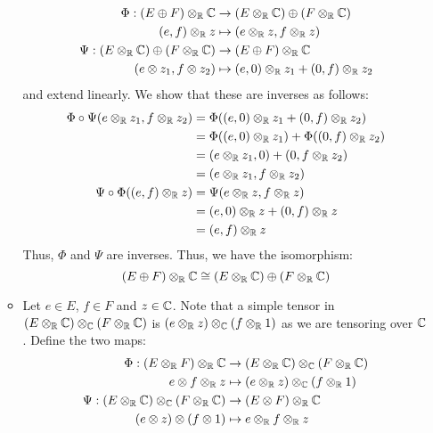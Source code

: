 \documentclass[12pt]{article}
\begin{document}
\begin{solution}
\begin{enumerate}
\begin{itemize}
            \begin{align*}
                \Phi: (E \oplus F) \otimes_\mathbb R \mathbb C &\to (E \otimes_\mathbb R \mathbb C) \oplus (F \otimes_\mathbb R \mathbb C) \\
                (e, f) \otimes_\mathbb R z &\mapsto (e \otimes_\mathbb R z, f \otimes_\mathbb R z) \\
                \Psi: (E \otimes_\mathbb R \mathbb C) \oplus (F \otimes_\mathbb R \mathbb C) &\to (E \oplus F) \otimes_\mathbb R \mathbb C \\
                (e \otimes z_1, f \otimes z_2) &\mapsto (e, 0) \otimes_\mathbb R z_1 + (0, f) \otimes_\mathbb R z_2
            \end{align*} 
            and extend linearly. We show that these are inverses as follows:
            \begin{align*}
                \Phi \circ \Psi(e \otimes_\mathbb R z_1, f \otimes_\mathbb R z_2) &= \Phi((e, 0) \otimes_\mathbb R z_1 + (0, f) \otimes_\mathbb R z_2) \\ 
                &= \Phi((e, 0) \otimes_\mathbb R z_1) + \Phi((0, f) \otimes_\mathbb R z_2) \\
                &= (e \otimes_\mathbb R z_1, 0) + (0, f \otimes_\mathbb R z_2) \\
                &= (e \otimes_\mathbb R z_1, f \otimes_\mathbb R z_2) \\
                \Psi \circ \Phi((e, f) \otimes_\mathbb R z) &= \Psi(e \otimes_\mathbb R z, f \otimes_\mathbb R z) \\
                &= (e, 0) \otimes_\mathbb R z + (0, f) \otimes_\mathbb R z \\
                &= (e, f) \otimes_\mathbb R z
            \end{align*}
            Thus, $\Phi$ and $\Psi$ are inverses. Thus, we have the isomorphism:
            \[(E \oplus F) \otimes_\mathbb R \mathbb C \cong (E \otimes_\mathbb R \mathbb C) \oplus (F \otimes_\mathbb R \mathbb C)\]
            \item Let $e \in E$, $f\in F$ and $z \in \mathbb C$. Note that a simple tensor in $(E \otimes_\mathbb R \mathbb C) \otimes_\mathbb C (F \otimes_\mathbb R \mathbb C)$ is $(e \otimes_\mathbb R z) \otimes_\mathbb C (f \otimes_\mathbb R 1)$ as we are tensoring over $\mathbb C$. Define the two maps: 
            \begin{align*}
                \Phi: (E \otimes_\R F) \otimes_\R \C &\to (E \otimes_\R \C) \otimes_\C (F \otimes_\R \C) \\
                e \otimes f \otimes_\R z &\mapsto (e \otimes_\R z) \otimes_\C (f \otimes_\R 1) \\
                \Psi: (E \otimes_\R \C) \otimes_\C (F \otimes_\R \C) &\to (E \otimes F) \otimes_\R \C \\
                (e \otimes z) \otimes (f \otimes 1) &\mapsto e \otimes_\R f \otimes_\R z

\end{align*}
\end{itemize}
\end{enumerate}
\end{solution}
\end{document}
